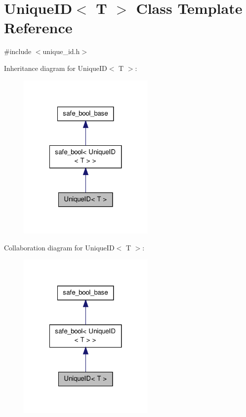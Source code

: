 \hypertarget{class_unique_i_d}{\section{Unique\-I\-D$<$ T $>$ Class Template Reference}
\label{class_unique_i_d}
}


{\ttfamily \#include $<$unique\-\_\-id.\-h$>$}



Inheritance diagram for Unique\-I\-D$<$ T $>$\-:\nopagebreak
\begin{figure}[H]
\begin{center}
\leavevmode
\includegraphics[width=188pt]{class_unique_i_d__inherit__graph}
\end{center}
\end{figure}


Collaboration diagram for Unique\-I\-D$<$ T $>$\-:\nopagebreak
\begin{figure}[H]
\begin{center}
\leavevmode
\includegraphics[width=188pt]{class_unique_i_d__coll__graph}
\end{center}
\end{figure}
